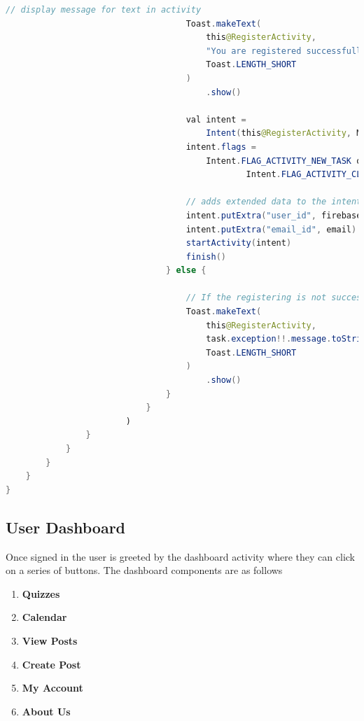 \begin{lstlisting}[language=Java, caption=Facebook Login /Sign up ]
                                    // display message for text in activity
                                    Toast.makeText(
                                        this@RegisterActivity,
                                        "You are registered successfully",
                                        Toast.LENGTH_SHORT
                                    )
                                        .show()

                                    val intent =
                                        Intent(this@RegisterActivity, MainActivity::class.java)
                                    intent.flags =
                                        Intent.FLAG_ACTIVITY_NEW_TASK or
                                                Intent.FLAG_ACTIVITY_CLEAR_TASK

                                    // adds extended data to the intent.
                                    intent.putExtra("user_id", firebaseUser.uid)
                                    intent.putExtra("email_id", email)
                                    startActivity(intent)
                                    finish()
                                } else {

                                    // If the registering is not successful then show error message.
                                    Toast.makeText(
                                        this@RegisterActivity,
                                        task.exception!!.message.toString(),
                                        Toast.LENGTH_SHORT
                                    )
                                        .show()
                                }
                            }
                        )
                }
            }
        }
    }
}


\end{lstlisting}



\subsection{User Dashboard}
Once signed in the user is greeted by the dashboard activity where they can click on a series of buttons. The dashboard components are as follows

\begin{enumerate}
  \item \textbf{Quizzes}
  \item  \textbf{Calendar}
  \item \textbf{View Posts} 
  \item \textbf{Create Post}  
  \item \textbf{My Account}    
   \item \textbf{About Us}      
\end{enumerate}



